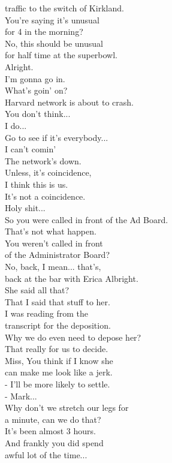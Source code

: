 \documentclass{article}
\begin{document}
\begin{multicols}{3}
traffic to the switch of Kirkland.\\
You're saying it's unusual\\
for 4 in the morning?\\
No, this should be unusual\\
for half time at the superbowl.\\
Alright.\\
I'm gonna go in.\\
What's goin' on?\\
Harvard network is about to crash.\\
You don't think...\\
I do...\\
Go to see if it's everybody...\\
I can't comin'\\
The network's down.\\
Unless, it's coincidence,\\
I think this is us.\\
It's not a coincidence.\\
Holy shit...\\
So you were called in front of the Ad Board.\\
That's not what happen.\\
You weren't called in front\\
of the Administrator Board?\\
No, back, I mean... that's,\\
back at the bar with Erica Albright.\\
She said all that?\\
That I said that stuff to her.\\
I was reading from the\\
transcript for the deposition.\\
Why we do even need to depose her?\\
That really for us to decide.\\
Miss, You think if I know she\\
can make me look like a jerk.\\
- I'll be more likely to settle.\\
- Mark...\\
Why don't we stretch our legs for\\
a minute, can we do that?\\
It's been almost 3 hours.\\
And frankly you did spend\\
awful lot of the time...\\

\end{multicols}
\end{document}
